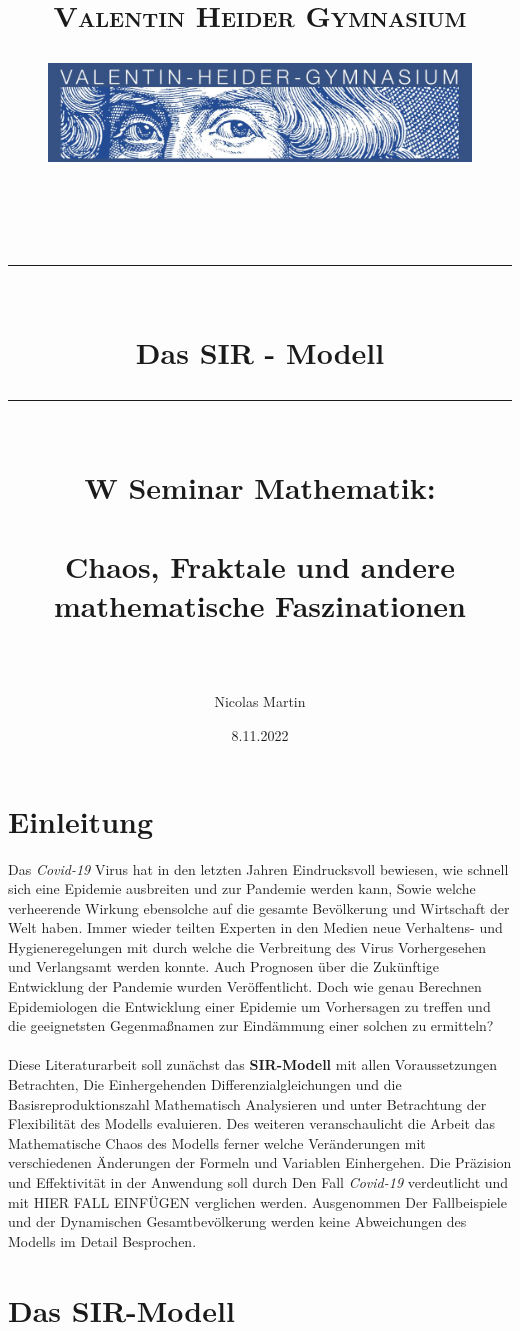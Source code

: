 \documentclass[12pt]{scrartcl} %
\title{	
	\normalfont\normalsize
	\vspace{200pt}
	\textsc{Valentin Heider Gymnasium}\\
	\begin{figure}[h] %
	\centering
	\includegraphics[width=0.5\columnwidth]{VHGLogo.jpg} 
	\end{figure}
	\vspace{25pt}\\
	
	\rule{\linewidth}{0.5pt}\\
	\vspace{20pt}
	{\huge Das SIR - Modell}\\
	\vspace{12pt}
	\rule{\linewidth}{2pt}\\
	\vspace{20pt}
	{\Large W Seminar Mathematik:}\\
	\vspace{12pt}\\
	{\Large Chaos, Fraktale und andere mathematische Faszinationen}\\
	\vspace{15pt}\\
}
\author{\LARGE Nicolas Martin} %
\date{\normalsize 8.11.2022}
\begin{document}

\maketitle %
\newpage

\doublespacing
\tableofcontents
\onehalfspacing
\newpage


\section{Einleitung}

Das \textsl{Covid-19} Virus hat in den letzten Jahren Eindrucksvoll bewiesen, wie schnell sich eine Epidemie ausbreiten und zur Pandemie werden kann,  
Sowie welche verheerende Wirkung ebensolche auf die gesamte Bevölkerung und Wirtschaft der Welt haben. 
Immer wieder teilten Experten in den Medien neue Verhaltens- und Hygieneregelungen mit durch welche die Verbreitung des Virus Vorhergesehen und Verlangsamt werden konnte. Auch Prognosen über die Zukünftige Entwicklung der Pandemie wurden Veröffentlicht. 
Doch wie genau Berechnen Epidemiologen die Entwicklung einer Epidemie um Vorhersagen zu treffen und die geeignetsten Gegenmaßnamen zur Eindämmung einer solchen zu ermitteln?\\
\\
Diese Literaturarbeit soll zunächst das \textbf{SIR-Modell} mit allen Voraussetzungen Betrachten, Die Einhergehenden Differenzialgleichungen und die Basisreproduktionszahl Mathematisch Analysieren und unter Betrachtung der Flexibilität des Modells evaluieren. 
Des weiteren veranschaulicht die Arbeit das Mathematische Chaos des Modells 
ferner welche Veränderungen mit verschiedenen Änderungen der Formeln und Variablen Einhergehen. 
Die Präzision und Effektivität in der Anwendung soll durch Den Fall \textsl{Covid-19} verdeutlicht und mit  HIER FALL EINFÜGEN verglichen werden. 
Ausgenommen Der Fallbeispiele und der Dynamischen Gesamtbevölkerung werden keine Abweichungen des Modells im Detail Besprochen. 


\newpage
\section{Das SIR-Modell}
\end{document}
